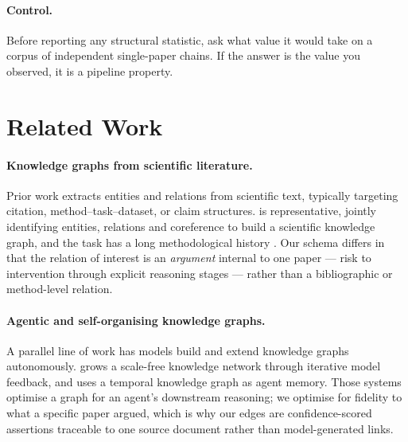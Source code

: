 \documentclass[10pt,twocolumn,letterpaper]{article}
\begin{document}
\paragraph{Control.} Before reporting any structural statistic, ask what value it would
take on a corpus of independent single-paper chains. If the answer is the value you
observed, it is a pipeline property.

\section{Related Work}
\label{sec:related}

\paragraph{Knowledge graphs from scientific literature.} Prior work extracts entities and
relations from scientific text, typically targeting citation, method--task--dataset, or
claim structures. \citet{luan2018scierc} is representative, jointly identifying entities,
relations and coreference to build a scientific knowledge graph, and the task has a long
methodological history \citep{bach2007relation}. Our schema differs in that the relation
of interest is an \emph{argument} internal to one paper --- risk to intervention through
explicit reasoning stages --- rather than a bibliographic or method-level relation.

\paragraph{Agentic and self-organising knowledge graphs.} A parallel line of work has
models build and extend knowledge graphs autonomously. \citet{buehler2025agentic} grows a
scale-free knowledge network through iterative model feedback, and
\citet{rasmussen2025zep} uses a temporal knowledge graph as agent memory. Those systems
optimise a graph for an agent's downstream reasoning; we optimise for fidelity to what a
specific paper argued, which is why our edges are confidence-scored assertions traceable
to one source document rather than model-generated links.
\end{document}
